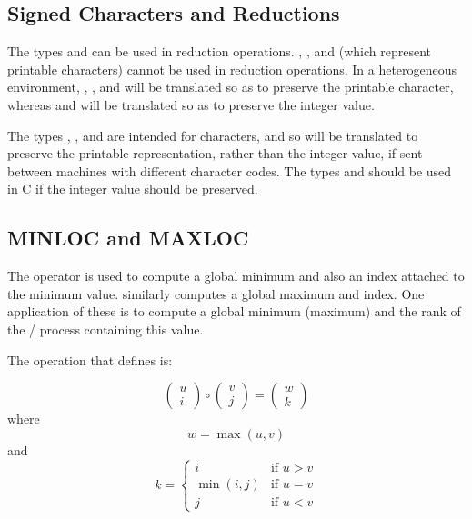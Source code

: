 \subsection{Signed Characters and Reductions}

The types  and  can be
used in reduction operations. ,
, and  (which represent printable
characters) cannot be used in reduction operations.
In a heterogeneous environment,
, , and 
will be translated so as to preserve the printable character, whereas
 and  will be
translated so as to preserve the integer value.

\begin{users}
The types , , and  are intended for
characters, and so will be translated to preserve the printable
representation, rather than the integer value, if sent between machines with
different character codes.  The types  and
 should be used in C if the integer value
should be preserved.
\end{users}



\subsection{MINLOC and MAXLOC}
\label{coll-minloc-maxloc}

The operator  is used to compute
a global minimum and also
an index attached to the minimum value.
 similarly computes a global maximum and index.
One application of these is to compute a global minimum (maximum) and the
rank of the \MPI/ process containing this value.

The operation that defines  is:

\[
\left( \begin{array}{c} u \\ i \end{array} \right)
\circ
\left( \begin{array}{c} v \\ j \end{array} \right)
=
\left( \begin{array}{c} w \\ k \end{array} \right)
\]
where
\[
w = \max (u,v)
\]
and
\[
k = \left\{ \begin{array}{ll}
    i & \mbox{if $u > v$} \\
    \min(i,j) & \mbox{if $u=v$} \\
    j & \mbox{if $u < v$}
\end{array}
\right.
\]

